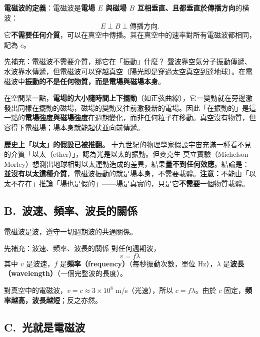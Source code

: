 \documentclass[11pt]{article}
\begin{document}
\textbf{電磁波的定義}：電磁波是\textbf{電場 $E$ 與磁場 $B$ 互相垂直、且都垂直於傳播方向}的橫波：
$$E\perp B\perp \text{傳播方向}.$$
它\textbf{不需要任何介質}，可以在真空中傳播。其在真空中的速率對所有電磁波都相同，記為 $c$。


\begin{補充框}{先補充：電磁波不需要介質，那它在「振動」什麼？}
聲波靠空氣分子振動傳遞、水波靠水傳遞，但電磁波可以穿越真空（陽光即是穿過太空真空到達地球）。在電磁波中\textbf{振動的不是任何物質，而是電場與磁場本身}。

在空間某一點，\textbf{電場的大小隨時間上下擺動}（如正弦曲線），它一變動就在旁邊激發出同樣在擺動的磁場，磁場的變動又往前激發新的電場。因此「在振動的」是這一點的\textbf{電場強度與磁場強度}在週期變化，而非任何粒子在移動。真空沒有物質，但容得下電磁場；場本身就能起伏並向前傳遞。

\textbf{歷史上「以太」的假設已被推翻。} 十九世紀的物理學家假設宇宙充滿一種看不見的介質「以太（ether）」，認為光是以太的振動。但麥克生-莫立實驗（Michelson-Morley）想測出地球相對以太運動造成的差異，結果\textbf{量不到任何效應}。結論是：\textbf{並沒有以太這種介質}，電磁波振動的就是場本身，不需要載體。\textbf{注意：}不能由「以太不存在」推論「場也是假的」——場是真實的，只是它\textbf{不需要}一個物質載體。
\end{補充框}

\subsection*{\sffamily B.\ 波速、頻率、波長的關係}

電磁波是波，遵守一切週期波的共通關係。

\begin{補充框}{先補充：波速、頻率、波長的關係}
對任何週期波，
$$\boxed{\;v=f\lambda\;}$$
其中 $v$ 是波速，$f$ 是\textbf{頻率（frequency）}（每秒振動次數，單位 Hz），$\lambda$ 是\textbf{波長（wavelength）}（一個完整波的長度）。

對真空中的電磁波，$v=c\approx 3\times10^{8}$ m/s（光速），所以 $c=f\lambda$。由於 $c$ 固定，\textbf{頻率越高，波長越短}；反之亦然。
\end{補充框}

\subsection*{\sffamily C.\ 光就是電磁波}
\end{document}
